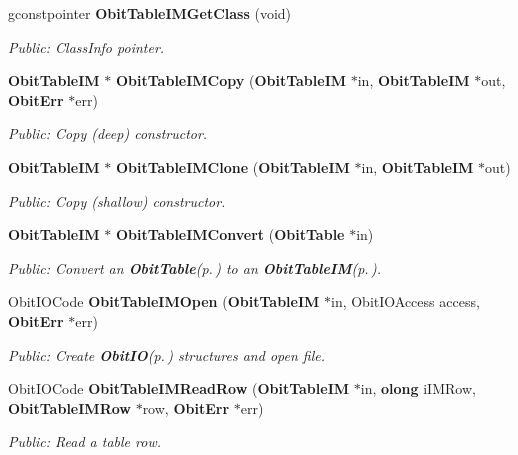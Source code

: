 \begin{CompactItemize}
gconstpointer {\bf Obit\-Table\-IMGet\-Class} (void)
\begin{CompactList}\small\item\em Public: Class\-Info pointer. \item\end{CompactList}\item 
{\bf Obit\-Table\-IM} $\ast$ {\bf Obit\-Table\-IMCopy} ({\bf Obit\-Table\-IM} $\ast$in, {\bf Obit\-Table\-IM} $\ast$out, {\bf Obit\-Err} $\ast$err)
\begin{CompactList}\small\item\em Public: Copy (deep) constructor. \item\end{CompactList}\item 
{\bf Obit\-Table\-IM} $\ast$ {\bf Obit\-Table\-IMClone} ({\bf Obit\-Table\-IM} $\ast$in, {\bf Obit\-Table\-IM} $\ast$out)
\begin{CompactList}\small\item\em Public: Copy (shallow) constructor. \item\end{CompactList}\item 
{\bf Obit\-Table\-IM} $\ast$ {\bf Obit\-Table\-IMConvert} ({\bf Obit\-Table} $\ast$in)
\begin{CompactList}\small\item\em Public: Convert an {\bf Obit\-Table}{\rm (p.\,\pageref{structObitTable})} to an {\bf Obit\-Table\-IM}{\rm (p.\,\pageref{structObitTableIM})}. \item\end{CompactList}\item 
Obit\-IOCode {\bf Obit\-Table\-IMOpen} ({\bf Obit\-Table\-IM} $\ast$in, Obit\-IOAccess access, {\bf Obit\-Err} $\ast$err)
\begin{CompactList}\small\item\em Public: Create {\bf Obit\-IO}{\rm (p.\,\pageref{structObitIO})} structures and open file. \item\end{CompactList}\item 
Obit\-IOCode {\bf Obit\-Table\-IMRead\-Row} ({\bf Obit\-Table\-IM} $\ast$in, {\bf olong} i\-IMRow, {\bf Obit\-Table\-IMRow} $\ast$row, {\bf Obit\-Err} $\ast$err)
\begin{CompactList}\small\item\em Public: Read a table row. \item\end{CompactList}\item 

\end{CompactItemize}
